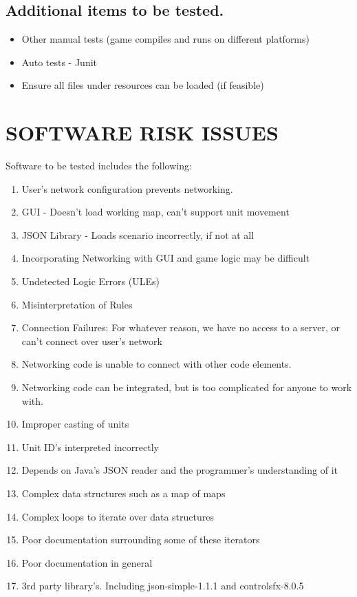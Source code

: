 {\subsection	{Additional items to be tested.}

{\color{black}
\begin{itemize}
\item Other manual tests (game compiles and runs on different platforms)
\item Auto tests - Junit
\item Ensure all files under resources can be loaded (if feasible)
\end{itemize}
}

\section[SOFTWARE RISK ISSUES]{\bfseries\color{black} SOFTWARE RISK ISSUES}
{\color{black}
Software to be tested includes the following:

\begin{enumerate}
\item User's network configuration prevents networking.
\item  GUI - Doesn't load working map, can't support unit movement
\item  JSON Library - Loads scenario incorrectly, if not at all
\item  Incorporating Networking with GUI and game logic may be difficult
\item  Undetected Logic Errors (ULEs)
\item  Misinterpretation of Rules
\item  Connection Failures: For whatever reason, we have no access to a server, or can't connect over user's network
\item  Networking code is unable to connect with other code elements.
\item  Networking code can be integrated, but is too complicated for anyone to work with.
\item Improper casting of units
\item Unit ID's interpreted incorrectly
\item Depends on Java's JSON reader and the programmer's understanding of it
\item Complex data structures such as a map of maps
\item Complex loops to iterate over data structures
\item Poor documentation surrounding some of these iterators
\item Poor documentation in general
\item 3rd party library's. Including json-simple-1.1.1 and controlsfx-8.0.5
\end{enumerate}
}
}

